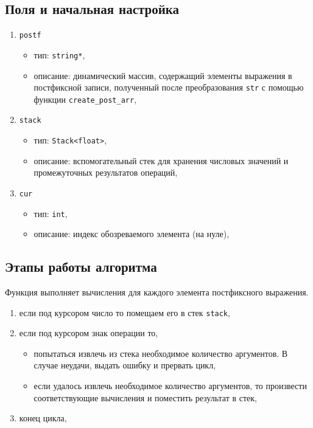 \subsection*{Поля и начальная настройка}
\begin{enumerate}
	\item \texttt{postf}
	\begin{itemize}
		\item тип: \texttt{string*},
		\item описание: динамический массив, содержащий элементы выражения в постфиксной записи, полученный после преобразования \texttt{str} с помощью функции \texttt{create\_post\_arr},
	\end{itemize}
	
	\item \texttt{stack}
	\begin{itemize}
		\item тип: \texttt{Stack<float>},
		\item описание: вспомогательный стек для хранения числовых значений и промежуточных результатов операций,
	\end{itemize}
	
	\item \texttt{cur}
	\begin{itemize}
		\item тип: \texttt{int},
		\item описание: индекс обозреваемого элемента (на нуле),
	\end{itemize}
\end{enumerate}

\subsection*{Этапы работы алгоритма}
Функция выполняет вычисления для каждого элемента постфиксного выражения.
\begin{enumerate}
	\item если под курсором число то помещаем его в стек \texttt{stack},
	
	\item если под курсором знак операции то,
	\begin{itemize}
		\item попытаться извлечь из стека необходимое количество аргументов. В случае неудачи, выдать ошибку и прервать цикл,
		\item если удалось извлечь необходимое количество аргументов, то произвести со\-ответствующие вычисления и поместить результат в стек,
	\end{itemize}
	
	\item конец цикла,
\end{enumerate}

\clearpage
